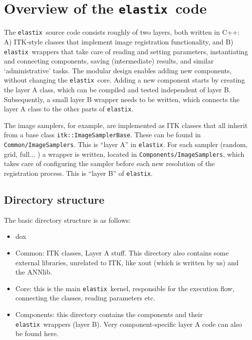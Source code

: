 \documentclass[]{report}
\newcommand{\elastix}{\texttt{elastix}}
\begin{document}

%
\section{Overview of the \elastix\ code}

The \elastix\ source code consists roughly of two layers, both
written in C++: A) ITK-style classes that implement image
registration functionality, and B) \elastix\ wrappers that take care
of reading and setting parameters, instantiating and connecting
components, saving (intermediate) results, and similar
`administrative' tasks. The modular design enables adding new
components, without changing the \elastix\ core. Adding a new
component starts by creating the layer A class, which can be
compiled and tested independent of layer B. Subsequently, a small
layer B wrapper needs to be written, which connects the layer A
class to the other parts of \elastix.

The image samplers, for example, are implemented as ITK classes that
all inherit from a base class \texttt{itk::ImageSamplerBase}. These
can be found in \texttt{Common/ImageSamplers}. This is ``layer A''
in \elastix. For each sampler (random, grid, full... ) a wrapper is
written, located in \texttt{Components/ImageSamplers}, which takes
care of configuring the sampler before each new resolution of the
registration process. This is ``layer B'' of \elastix.

\subsection{Directory structure}

The basic directory structure is as follows:
\begin{itemize}
\item dox
\item Common: ITK classes, Layer A stuff. This directory also contains
    some external libraries, unrelated to ITK, like xout (which is written
    by us) and the ANNlib.
\item Core: this is the main \elastix\ kernel, responsible for the
    execution flow, connecting the classes, reading parameters etc.
\item Components: this directory contains the components and their
    \elastix\ wrappers (layer B). Very component-specific layer A code can
    also be found here.
\end{itemize}
\end{document}
